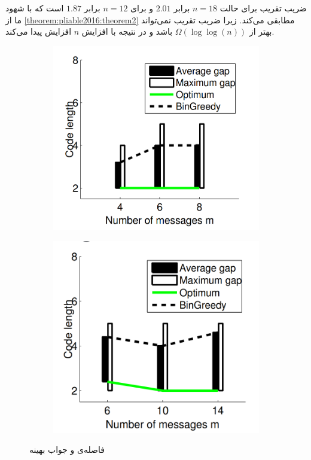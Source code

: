 ضریب تقریب برای حالت
$n = 18$
برابر
$2.01$
و برای
$n = 12$
برابر
$1.87$
است که با شهود ما از
\autoref{theorem:pliable2016:theorem2}
مطابقی می‌کند. زیرا ضریب تقریب نمی‌تواند بهتر از
$\Omega(\log \log (n))$
باشد و در نتیجه با افزایش
$n$
افزایش پیدا می‌کند.
\begin{figure}
    \centering
    \begin{subfigure}[b]{0.45\textwidth}
        \centering
        \includegraphics[width=1\linewidth]{figs/ch3/pliable2016_3a}
        \caption{}
        \label{fig:pliable20163a}
    \end{subfigure}
    \hfill
    \begin{subfigure}[b]{0.45\textwidth}
        \centering
        \includegraphics[width=1\linewidth]{figs/ch3/pliable2016_3b}
        \caption{}
        \label{fig:pliable20163b}
    \end{subfigure}
    \caption{
        فاصله‌ی
        و جواب بهینه
    }
    \label{fig:pliable20163}
\end{figure}









